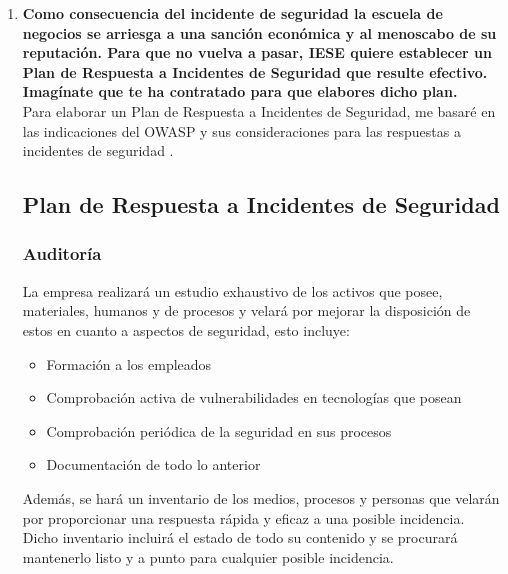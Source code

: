 \documentclass[10pt,a4paper]{article}
\begin{document}
\begin{enumerate}
\item \textbf{Como consecuencia del incidente de seguridad la escuela de negocios se arriesga a una sanción económica y al menoscabo de su reputación. Para que no vuelva a pasar, IESE quiere establecer un Plan de Respuesta a Incidentes de Seguridad que resulte efectivo. Imagínate que te ha contratado para que elabores dicho plan.}\\
Para elaborar un Plan de Respuesta a Incidentes de Seguridad, me basaré en las indicaciones del OWASP y sus consideraciones para las respuestas a incidentes de seguridad \cite{OWASP}.\\

\subsection{Plan de Respuesta a Incidentes de Seguridad}
\subsubsection{Auditoría}
La empresa realizará un estudio exhaustivo de los activos que posee, materiales, humanos y de procesos y velará por mejorar la disposición de estos en cuanto a aspectos de seguridad, esto incluye:
\begin{itemize}
\item Formación a los empleados
\item Comprobación activa de vulnerabilidades en tecnologías que posean
\item Comprobación periódica de la seguridad en sus procesos
\item Documentación de todo lo anterior
\end{itemize} 

Además, se hará un inventario de los medios, procesos y personas que velarán por proporcionar una respuesta rápida y eficaz a una posible incidencia. Dicho inventario incluirá el estado de todo su contenido y se procurará mantenerlo listo y a punto para cualquier posible incidencia.


\end{enumerate}
\end{document}
